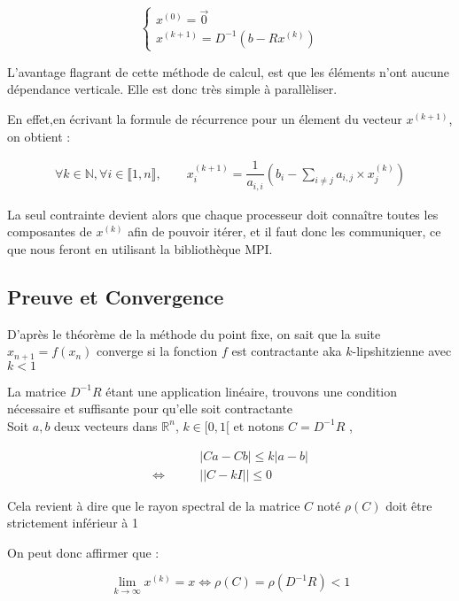 \documentclass[11pt, a4paper]{article}
\begin{document}
\[
    \left\{
    \begin{array}{l}
        x^{(0)} = \vec{0}\\
        x^{(k+1)} = D^{-1}( b - Rx^{(k)})
    \end{array}
    \right.
\]

L'avantage flagrant de cette méthode de calcul, est que les éléments n'ont aucune dépendance verticale. Elle est donc très simple à parallèliser. 

En effet,en écrivant la formule de récurrence pour un élement du vecteur $x^{(k+1)}$, on obtient :

\begin{align}
    \forall k \in \mathbb{N}, \forall i \in \llbracket 1,n \rrbracket, 
    \qquad x_{i}^{(k+1)} = \dfrac{1}{a_{i,i}}(b_i - \sum_{i \neq j}a_{i,j} \times x^{(k)}_j)
\end{align}

La seul contrainte devient alors que chaque processeur doit conna\^itre toutes les composantes de $x^{(k)}$ afin de pouvoir itérer, et il faut donc les communiquer, ce que nous feront en utilisant la bibliothèque MPI.

\subsection{Preuve et Convergence}

D'après le théorème de la méthode du point fixe, on sait que la suite $x_{n+1} = f(x_n)$ converge si la fonction $f$ est contractante aka $k$-lipshitzienne avec $k < 1$

La matrice $D^{-1}R$ étant une application linéaire, trouvons une condition nécessaire et suffisante pour qu'elle soit contractante \\

Soit $a,b$ deux vecteurs dans $\mathbb{R}^n$, $k \in [0,1[$ et notons $C = D^{-1}R$ , 

\begin{align}
    &|Ca - Cb| \leq k|a-b|\\
    \Leftrightarrow \qquad & ||C - kI|| \leq 0
\end{align}

Cela revient à dire que le rayon spectral de la matrice $C$ noté $\rho(C)$ doit \^etre strictement inférieur à 1

On peut donc affirmer que :

\[
\lim_{k \to \infty}x^{(k)} = x \Leftrightarrow \rho(C) = \rho(D^{-1}R) < 1
\]

\newpage 
\end{document}
